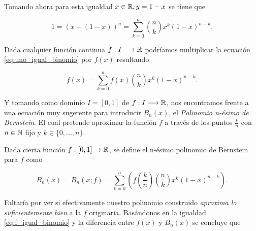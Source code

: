 Tomando ahora para esta igualdad $x \in \mathbb{R}, y= 1-x$ se tiene que 

\begin{equation}\label{eq:uno_igual_binomio}
    1 = (x+ (1-x))^n = \sum_{k=0}^n \binom{n}{k} x^{k} (1-x)^{n-k}.
\end{equation}

Dada cualquier función continua $f: I \longrightarrow \mathbb{R}$ podríamos multiplicar la ecuación 
\eqref{eq:uno_igual_binomio} por $f(x)$ resultando 

\begin{equation}\label{eq:f_igual_binomio}
    f(x) = \sum_{k=0}^n f(x) \binom{n}{k} x^{k} (1-x)^{n-k}.
\end{equation} 

Y tomando como dominio $I=[0,1]$ de $f: I \longrightarrow \mathbb{R}$,
 nos encontramos
frente a una ecuación muy sugerente para introducir $B_n(x)$, el \textit{Polinomio n-ésimo  de Bernstein}. 
El cual pretende  aproximar la función $f$ a través de los puntos $\frac{k}{n}$ con $n \in \mathbb{N}$ fijo
y $k \in \{0,...,n \}.$

\begin{definicion} \label{def:Bernstein}
    Dada cierta función $f: [0,1] \rightarrow \mathbb{R}$, se define el n-ésimo polinomio de Bernstein para $f$ como 

    $$B_n(x) = B_n(x;f)=\sum_ {k=0}^{n} \left( f \left( \frac{k}{n} \right) \binom{n}{k} x^k (1-x)^{n-k} \right).$$

\end{definicion}

Faltaría por ver si efectivamente nuestro polinomio construido
 \textit{aproxima lo suficientemente bien} a la $f$ originaria. 
Basándonos en la igualdad \eqref{eq:f_igual_binomio} y 
la diferencia entre $f(x)$ y $B_n(x)$ se concluye que


